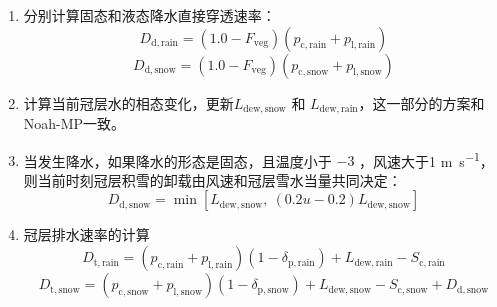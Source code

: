 \begin{enumerate}
  \item 分别计算固态和液态降水直接穿透速率：
    \begin{equation}
      D_{\mathrm{d,rain}}=\left(1.0-F_{\mathrm{veg}}\right)  (p_{\mathrm{c,rain}}+p_{\mathrm{l,rain}})
    \end{equation}
    \begin{equation}
      D_{\mathrm{d,snow}}=\left(1.0-F_{\mathrm{veg}}\right)  (p_{\mathrm{c,snow}}+p_{\mathrm{l,snow}})
    \end{equation}

  \item 计算当前冠层水的相态变化，更新$L_{\mathrm{dew,snow}}$ 和 $L_{\mathrm{dew,rain}}$，这一部分的方案和Noah-MP一致。

  \item 当发生降水，如果降水的形态是固态，且温度小于 $-3$ \textcelsius ，风速大于1 \unit{m.s^{-1}}，则当前时刻冠层积雪的卸载由风速和冠层雪水当量共同决定：
    \begin{equation}
      D_{\mathrm{d,snow}} = \min\left[L_{\mathrm{dew,snow}},\ (0.2u-0.2)  L_{\mathrm{dew,snow}}\right]
    \end{equation}

  \item 冠层排水速率的计算
    \begin{equation}
      D_{\mathrm {t,rain}}=\left(p_{\mathrm{c,rain}}+p_{\mathrm{l,rain}}\right)\left(1-\delta_{\mathrm{p,rain}}\right)+L_{\mathrm{dew,rain}}-S_{\mathrm{c,rain}}
    \end{equation}
    \begin{equation}
      D_{\mathrm {t,snow}}=\left(p_{\mathrm{c,snow}}+p_{\mathrm{l,snow}}\right)\left(1-\delta_{\mathrm{p,snow}}\right)+L_{\mathrm{dew,snow}}-S_{\mathrm{c,snow}}+D_{\mathrm{d,snow}}
    \end{equation}


\end{enumerate}
